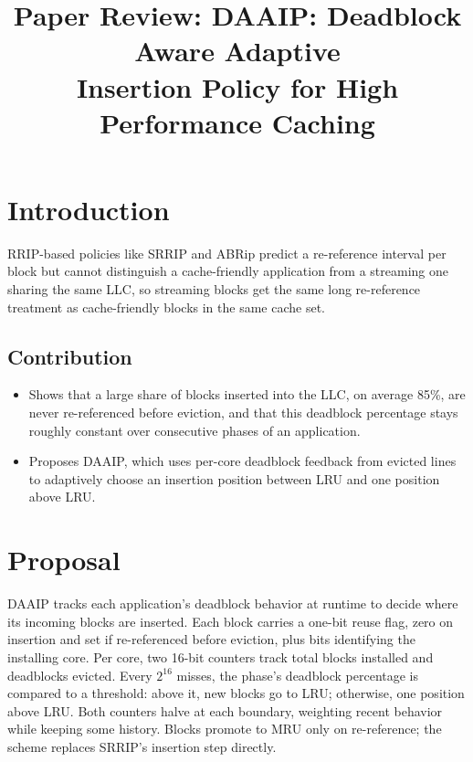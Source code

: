 \documentclass[10pt, conference]{IEEEtran}
\begin{document}
\title{\Large\bfseries Paper Review: DAAIP: Deadblock Aware Adaptive\\Insertion Policy for High Performance Caching}

\author{
}

\maketitle

\section{Introduction}
RRIP-based policies like SRRIP and ABRip predict a re-reference interval per block but cannot distinguish a cache-friendly application from a streaming one sharing the same LLC, so streaming blocks get the same long re-reference treatment as cache-friendly blocks in the same cache set.

\subsection{Contribution}
\begin{itemize}[leftmargin=*, itemsep=0pt, topsep=1pt, parsep=0pt]
    \item Shows that a large share of blocks inserted into the LLC, on average 85\%, are never re-referenced before eviction, and that this deadblock percentage stays roughly constant over consecutive phases of an application.
    \item Proposes DAAIP, which uses per-core deadblock feedback from evicted lines to adaptively choose an insertion position between LRU and one position above LRU.
\end{itemize}

\section{Proposal}
DAAIP tracks each application's deadblock behavior at runtime to decide where its incoming blocks are inserted. Each block carries a one-bit reuse flag, zero on insertion and set if re-referenced before eviction, plus bits identifying the installing core. Per core, two 16-bit counters track total blocks installed and deadblocks evicted. Every $2^{16}$ misses, the phase's deadblock percentage is compared to a threshold: above it, new blocks go to LRU; otherwise, one position above LRU. Both counters halve at each boundary, weighting recent behavior while keeping some history. Blocks promote to MRU only on re-reference; the scheme replaces SRRIP's insertion step directly.
\end{document}
